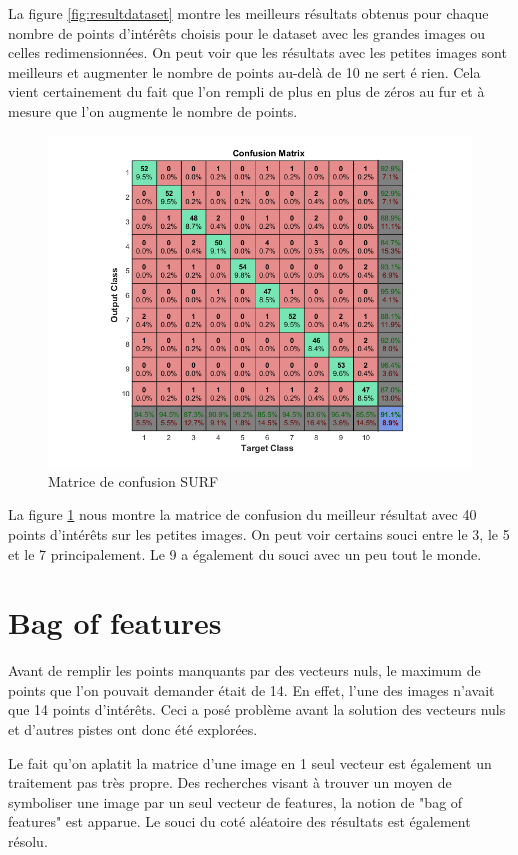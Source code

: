 La figure \ref{fig:resultdataset} montre les meilleurs résultats obtenus pour chaque nombre de points d'intérêts choisis pour le dataset avec les grandes images ou celles redimensionnées. On peut voir que les résultats avec les petites images sont meilleurs et augmenter le nombre de points au-delà de 10 ne sert é rien. Cela vient certainement du fait que l'on rempli de plus en plus de zéros au fur et à mesure que l'on augmente le nombre de points.

\begin{figure}[h]
\centering
\includegraphics[width=0.8\linewidth]{pictures/small_40_ann_surf.png}
\caption{Matrice de confusion SURF}
\label{fig:confusionmatrice1}
\end{figure}

La figure \ref{fig:confusionmatrice1} nous montre la matrice de confusion du meilleur résultat avec 40 points d'intérêts sur les petites images. On peut voir certains souci entre le 3, le 5 et le 7 principalement. Le 9 a également du souci avec un peu tout le monde.

\section{Bag of features}

Avant de remplir les points manquants par des vecteurs nuls, le maximum de points que l'on pouvait demander était de 14. En effet, l'une des images n'avait que 14 points d'intérêts. Ceci a posé problème avant la solution des vecteurs nuls et d'autres pistes ont donc été explorées.

Le fait qu'on aplatit la matrice d'une image en 1 seul vecteur est également un traitement pas très propre. Des recherches visant à trouver un moyen de symboliser une image par un seul vecteur de features, la notion de "bag of features" est apparue. Le souci du coté aléatoire des résultats est également résolu.

